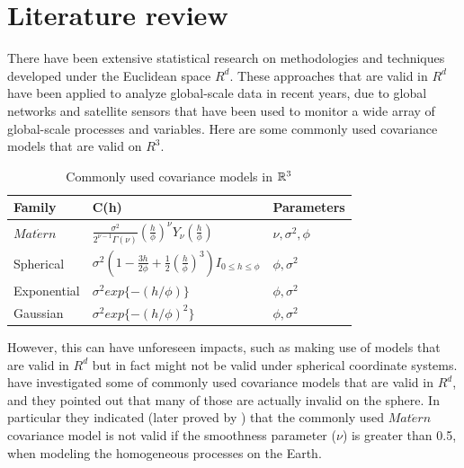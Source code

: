 \section{Literature review}

There have been extensive statistical research on methodologies and techniques developed under the Euclidean space $R^d$. These approaches that are valid in $R^d$ have been applied to analyze global-scale data in recent years, due to global networks and satellite sensors that have been used to monitor a wide array of global-scale processes and variables. Here are some commonly used covariance models that are valid on $R^3$.

\begin{table}[H]
\label{parameters}
\centering
\begin{tabular}{|l|l|l|}
\hline
Family & C(h)  & Parameters \\ \hline \hline
$Mat\acute{e}rn$ &  $\frac{\sigma^2}{2^{\nu-1}\Gamma(\nu)} (\frac{h}{\phi})^{\nu} Y_{\nu}(\frac{h}{\phi})$  & $\nu, \sigma^2, \phi$  \\

Spherical & $\sigma^2(1-\frac{3h}{2\phi}+\frac{1}{2}(\frac{h}{\phi})^3)I_{0\le h\le \phi}$ & $\phi, \sigma^2$ \\

Exponential & $\sigma^2exp\{-(h/\phi)\}$ & $\phi, \sigma^2$  \\

Gaussian & $\sigma^2exp \{-(h/\phi)^2\}$ & $\phi, \sigma^2$  \\ \hline
\end{tabular}
\caption{Commonly used covariance models in $\mathbb{R}^3$} %
\end{table}

However, this can have unforeseen impacts, such as making use of models that are valid in $R^d$ but in fact might not be valid under spherical coordinate systems. \cite{HuangZhangRobeson2011} have investigated some of commonly used covariance models that are valid in $R^d$, and they pointed out that many of those are actually invalid on the sphere. In particular they indicated (later proved by \cite{Gneiting2013}) that the commonly used $Mat\acute{e}rn$ covariance model is not valid if the smoothness parameter ($\nu$) is greater than 0.5, when modeling the homogeneous processes on the Earth. \\


